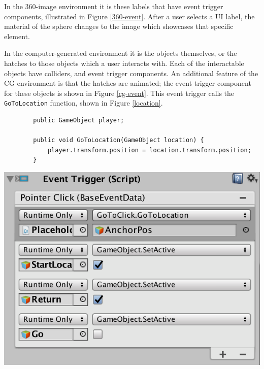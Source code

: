 \documentclass[a4paper, openright, twoside]{book}
\begin{document}
In the 360-image environment it is these labels that have event trigger components, illustrated in Figure \ref{360-event}. After a user selects a UI label, the material of the sphere changes to the image which showcases that specific element.

In the computer-generated environment it is the objects themselves, or the hatches to those objects which a user interacts with. Each of the interactable objects have colliders, and event trigger components. An additional feature of the CG environment is that the hatches are animated; the event trigger component for these objects is shown in Figure \ref{cg-event}. This event trigger calls the \lstinline{GoToLocation} function, shown in Figure \ref{location}. 

\begin{center}
    \centering
    \begin{minipage}{0.6\textwidth}
    \begin{lstlisting}
    	public GameObject player;
    
    	public void GoToLocation(GameObject location) {
    		player.transform.position = location.transform.position;
    	}
    \end{lstlisting}
    \label{location}
    \end{minipage}\hfill
    \begin{minipage}{0.35\textwidth}
        \centering
        \includegraphics[width=1\textwidth]{images/CG-event-component.png}
        \label{CG-event}
    \end{minipage}
\end{center}
\end{document}
